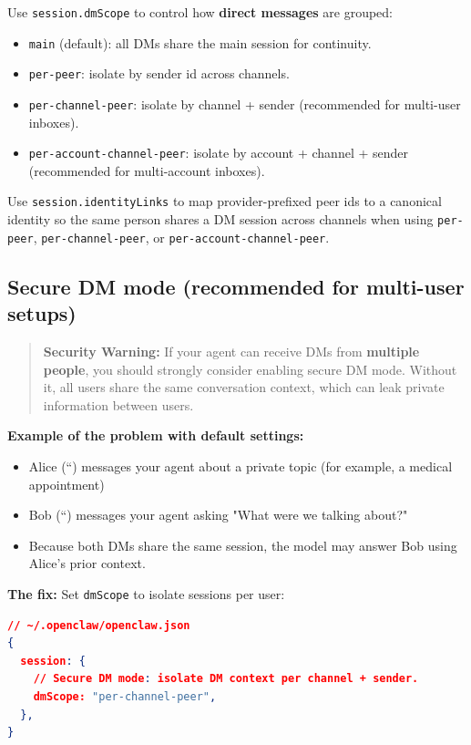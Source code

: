 Use \texttt{session.dmScope} to control how \textbf{direct messages} are grouped:

\begin{itemize}
  \item \texttt{main} (default): all DMs share the main session for continuity.
  \item \texttt{per-peer}: isolate by sender id across channels.
  \item \texttt{per-channel-peer}: isolate by channel + sender (recommended for multi-user inboxes).
  \item \texttt{per-account-channel-peer}: isolate by account + channel + sender (recommended for multi-account inboxes).
\end{itemize}

Use \texttt{session.identityLinks} to map provider-prefixed peer ids to a canonical identity so the same person shares a DM session across channels when using \texttt{per-peer}, \texttt{per-channel-peer}, or \texttt{per-account-channel-peer}.

\subsection{Secure DM mode (recommended for multi-user setups)}


\begin{quote}
\textbf{Security Warning:} If your agent can receive DMs from \textbf{multiple people}, you should strongly consider enabling secure DM mode. Without it, all users share the same conversation context, which can leak private information between users.
\end{quote}


\textbf{Example of the problem with default settings:}

\begin{itemize}
  \item Alice (``) messages your agent about a private topic (for example, a medical appointment)
  \item Bob (``) messages your agent asking "What were we talking about?"
  \item Because both DMs share the same session, the model may answer Bob using Alice's prior context.
\end{itemize}


\textbf{The fix:} Set \texttt{dmScope} to isolate sessions per user:

\begin{lstlisting}[language=json]
// ~/.openclaw/openclaw.json
{
  session: {
    // Secure DM mode: isolate DM context per channel + sender.
    dmScope: "per-channel-peer",
  },
}
\end{lstlisting}


